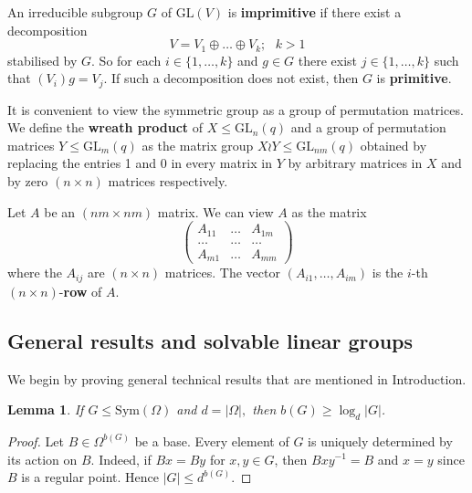 \documentclass[a4paper,reqno,11pt]{amsart}
\newtheorem{Lem}[Th]{Lemma}
\theoremstyle{definition}
\theoremstyle{remark}
\numberwithin{equation}{section}
\newcommand{\Sym}{\mathrm{Sym}}
\newcommand{\GL}{{\mathrm{GL}}}
\begin{document}
 An irreducible subgroup $G$ of $\GL(V)$ is {\bf imprimitive} if there exist a decomposition 
 $$V=V_1 \oplus \ldots \oplus V_k; \text{ } k>1$$  stabilised by $G$. So for each $i \in \{1, \ldots, k\}$ and $g \in G$ there exist   $j \in \{1, \ldots, k\}$ such that $(V_i)g=V_j.$ If such a decomposition does not exist, then $G$ is {\bf primitive}.

It is convenient to view  the symmetric group 
as a group of permutation matrices. We define the {\bf wreath product}   of  $X \le \GL_n(q)$ and a  group of permutation matrices $Y \le \GL_m(q)$ as the matrix group $X \wr Y \le \GL_{nm}(q)$ obtained
by replacing the entries 1 and 0  in every matrix in $Y$ by
arbitrary matrices in $X$ and by zero $(n \times n)$ matrices respectively. 

Let $A$ be an $(nm\times nm)$ matrix. We can view $A$ as the matrix
$$\begin{pmatrix}
A_{11}      &  \ldots & A_{1m}  \\
\ldots           &   \ldots   & \ldots   \\
A_{m1}     & \ldots     & A_{mm}      
\end{pmatrix}$$
where the $A_{ij}$ are $(n \times n)$ matrices. The vector $(A_{i1}, \ldots, A_{im})$ is the $i$-th $(n \times n)$-{\bf row}  of $A.$



\subsection{General results and solvable linear groups}
\label{missec}

We begin by proving general technical results that are mentioned in Introduction.

\begin{Lem}\label{logd}
If $G\le \Sym(\Omega)$ and $d=|\Omega|,$ then $b(G) \ge \log_d|G|$.
\end{Lem}
\begin{proof}
Let $B \in \Omega^{b(G)}$ be a base. Every element of $G$ is uniquely determined by its action on $B$. Indeed, if $Bx=By$ for $x,y \in G$, then $Bxy^{-1}=B$ and $x=y$ since $B$ is a regular point. Hence $|G|\le d^{b(G)}.$ 
\end{proof}
\end{document}

